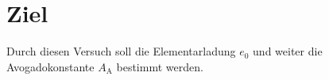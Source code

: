 \section{Ziel}
\label{sec:Ziel}
Durch diesen Versuch soll die Elementarladung $e_0$ und weiter die Avogadokonstante $A_{\text{A}}$ bestimmt werden.